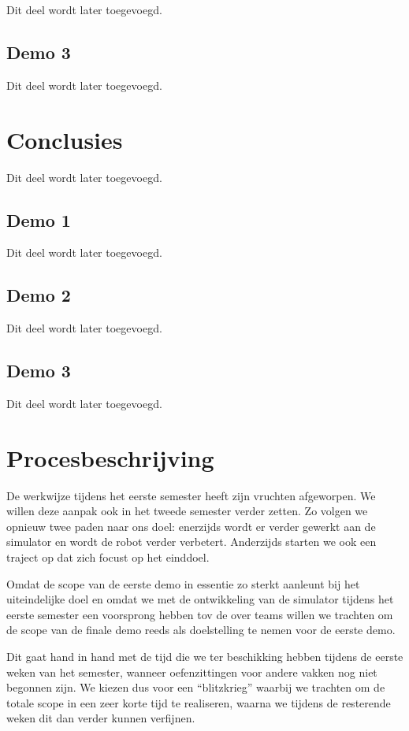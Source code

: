 \documentclass[12pt,a4paper]{report}
\begin{document}
Dit deel wordt later toegevoegd.

\section{Demo 3}

Dit deel wordt later toegevoegd.

\chapter{Conclusies}

Dit deel wordt later toegevoegd.

\section{Demo 1}

Dit deel wordt later toegevoegd.

\section{Demo 2}

Dit deel wordt later toegevoegd.

\section{Demo 3}

Dit deel wordt later toegevoegd.

\chapter{Procesbeschrijving}

De werkwijze tijdens het eerste semester heeft zijn vruchten afgeworpen. We willen deze aanpak ook in het tweede semester verder zetten. Zo volgen we opnieuw twee paden naar ons doel: enerzijds wordt er verder gewerkt aan de simulator en wordt de robot verder verbetert. Anderzijds starten we ook een traject op dat zich focust op het einddoel.

Omdat de scope van de eerste demo in essentie zo sterkt aanleunt bij het uiteindelijke doel en omdat we met de ontwikkeling van de simulator tijdens het eerste semester een voorsprong hebben tov de over teams willen we trachten om de scope van de finale demo reeds als doelstelling te nemen voor de eerste demo.

Dit gaat hand in hand met de tijd die we ter beschikking hebben tijdens de eerste weken van het semester, wanneer oefenzittingen voor andere vakken nog niet begonnen zijn. We kiezen dus voor een ``blitzkrieg'' waarbij we trachten om de totale scope in een zeer korte tijd te realiseren, waarna we tijdens de resterende weken dit dan verder kunnen verfijnen.
\end{document}
